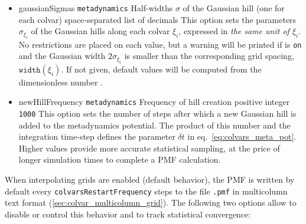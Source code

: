 \begin{itemize}
\item %
  \key
    {gaussianSigmas}{%
    \texttt{metadynamics}}{%
    Half-widths $\sigma$ of the Gaussian hill (one for each colvar)}{%
    space-separated list of decimals}{%
    This option sets the parameters $\sigma_{\xi_i}$ of the Gaussian hills along each colvar $\xi_i$, expressed in \emph{the same unit of $\xi_i$}.
    No restrictions are placed on each value, but a warning will be printed if  is \texttt{on} and the Gaussian width $2\sigma_{\xi_i}$ is smaller than the corresponding grid spacing, $\mathtt{width}({\xi_i})$.
    If not given, default values will be computed from the dimensionless number .
    }

\item %
  \keydef
    {newHillFrequency}{%
    \texttt{metadynamics}}{%
    Frequency of hill creation}{%
    positive integer}{%
    \texttt{1000}}{%
    This option sets the number of steps after which a new Gaussian hill is added to the metadynamics potential.
    The product of this number and the integration time-step defines the parameter $\delta{}t$ in eq.~\ref{eq:colvars_meta_pot}.
    Higher values provide more accurate statistical sampling, at the price of longer simulation times to complete a PMF calculation.
    }

\end{itemize}



When interpolating grids are enabled (default behavior), the PMF is written by default every \texttt{colvarsRestartFrequency} steps to the file \outputName\texttt{.pmf} in multicolumn text format (\ref{sec:colvar_multicolumn_grid}).
The following two options allow to disable or control this behavior and to track statistical convergence:

